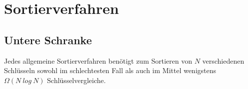 \section{Sortierverfahren}



\subsection{Untere Schranke}

\begin{tcolorbox}
    Jedes allgemeine Sortierverfahren benötigt zum Sortieren von $N$ verschiedenen Schlüsseln sowohl im schlechtesten Fall als auch im Mittel wenigstens $\Omega(N\ log\ N)$ Schlüsselvergleiche.
\end{tcolorbox}
